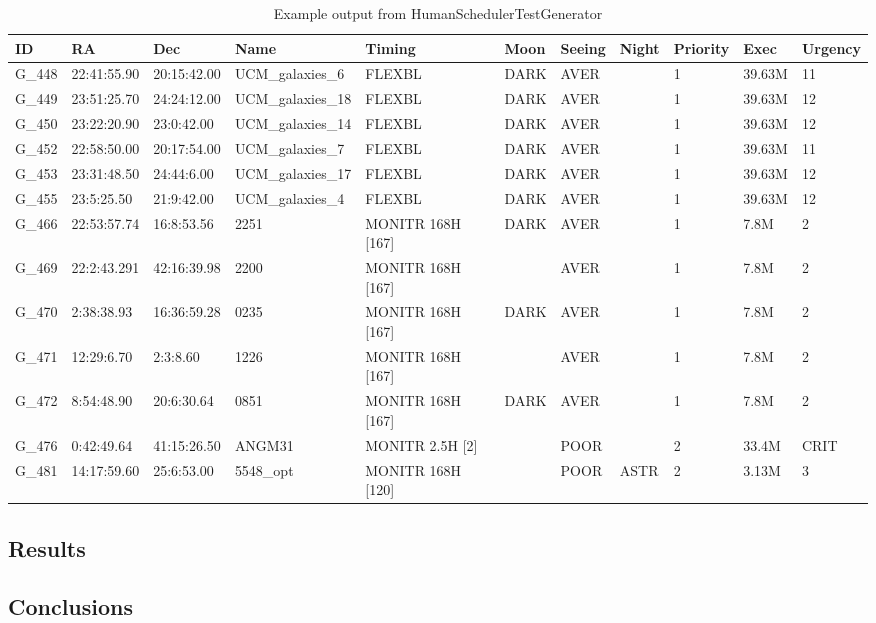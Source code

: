 \begin{landscape}

\begin{table}
\begin{center}
\caption{Example output from HumanSchedulerTestGenerator}
\begin{tabular}{|l|l|l|l|l|l|l|l|l|l|l|}
\hline
{\bf ID} & {\bf RA}    & {\bf Dec} & {\bf Name} & {\bf Timing} & {\bf Moon}  & {\bf Seeing} & {\bf Night}   & {\bf Priority}    & {\bf Exec}   & {\bf Urgency} \\
\hline
G\_448  &22:41:55.90  &20:15:42.00  &UCM\_galaxies\_6&FLEXBL  &DARK &AVER  &       &1 &39.63M  &11 \\
\hline
G\_449  &23:51:25.70  &24:24:12.00  &UCM\_galaxies\_18&FLEXBL &DARK &AVER  &       &1 &39.63M  &12 \\
\hline
G\_450  &23:22:20.90  &23:0:42.00&UCM\_galaxies\_14  &FLEXBL  &DARK &AVER  &       &1 &39.63M  &12 \\
\hline
G\_452  &22:58:50.00  &20:17:54.00  &UCM\_galaxies\_7&FLEXBL  &DARK &AVER  &       &1 &39.63M  &11 \\
\hline
G\_453  &23:31:48.50  &24:44:6.00&UCM\_galaxies\_17  &FLEXBL  &DARK &AVER  &       &1 &39.63M  &12 \\
\hline
G\_455  &23:5:25.50&21:9:42.00&UCM\_galaxies\_4&FLEXBL        &DARK &AVER  &       &1 &39.63M  &12  \\
\hline
G\_466  &22:53:57.74  &16:8:53.56&2251  &MONITR 168H [167]    &DARK &AVER  &       &1 &7.8M   &2  \\
\hline
G\_469  &22:2:43.291  &42:16:39.98  &2200 &MONITR 168H [167]  &     &AVER  &       &1 &7.8M   &2 \\ 
\hline
G\_470  &2:38:38.93&16:36:59.28  &0235 &MONITR 168H [167]     &DARK &AVER  &       &1 &7.8M   &2  \\
\hline
G\_471  &12:29:6.70&2:3:8.60  &1226 &MONITR 168H [167]        &     &AVER  &       &1 &7.8M   &2  \\
\hline
G\_472  &8:54:48.90&20:6:30.64&0851 &MONITR 168H [167]        &DARK &AVER  &       &1 &7.8M   &2  \\
\hline
G\_476  &0:42:49.64&41:15:26.50  &ANGM31  &MONITR 2.5H [2]    &     &POOR  &       &2 &33.4M   &CRIT  \\
\hline
G\_481  &14:17:59.60  &25:6:53.00&5548\_opt&MONITR 168H [120] &     &POOR  &ASTR   &2 &3.13M  &3  \\
\hline
\end{tabular}
\end{center}
\end{table}

\end{landscape}



\subsection{Results}

\subsection{Conclusions}
